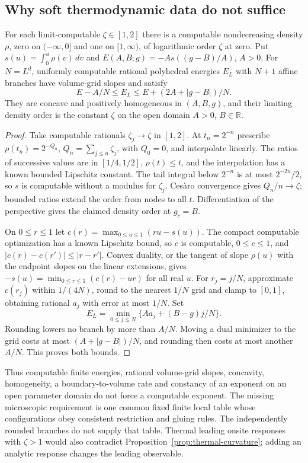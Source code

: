 \subsection{Why soft thermodynamic data do not suffice}
\begin{proposition}\label{prop:polyhedral-imitation}
For each limit-computable $\zeta\in[1,2]$ there is a computable
nondecreasing density $\rho$, zero on $(-\infty,0]$ and one on
$[1,\infty)$, of logarithmic order $\zeta$ at zero. Put
$s(u)=\int_0^u\rho(v)\,dv$ and
$E(A,B;g)=-A s((g-B)/A)$, $A>0$.
For $N=L^d$, uniformly computable rational polyhedral energies $E_L$
with $N+1$ affine branches have volume-grid slopes and satisfy
\[
 E-A/N\leq E_L\leq E+(2A+|g-B|)/N.
\]
They are concave and positively homogeneous in $(A,B,g)$, and their
limiting density order is the constant $\zeta$ on the open domain
$A>0$, $B\in\mathbb R$.
\end{proposition}
\begin{proof}
Take computable rationals $\zeta_j\to\zeta$ in $[1,2]$.
At $t_n=2^{-n}$ prescribe
$\rho(t_n)=2^{-Q_n}$, $Q_n=\sum_{j\leq n}\zeta_j$, with
$Q_0=0$, and interpolate linearly. The ratios of successive values
are in $[1/4,1/2]$, $\rho(t)\leq t$, and the interpolation has a
known bounded Lipschitz constant. The tail integral below $2^{-n}$
is at most $2^{-2n}/2$, so $s$ is computable without a modulus for
$\zeta_j$. Ces\`aro convergence gives $Q_n/n\to\zeta$; bounded
ratios extend the order from nodes to all $t$. Differentiation of
the perspective gives the claimed density order at $g_c=B$.

On $0\leq r\leq1$ let $c(r)=\max_{0\leq u\leq1}(ru-s(u))$.
The compact computable optimization has a known Lipschitz bound,
so $c$ is computable, $0\leq c\leq1$, and
$|c(r)-c(r')|\leq|r-r'|$. Convex duality, or the tangent of slope
$\rho(u)$ with the endpoint slopes on the linear extensions, gives
$-s(u)=\min_{0\leq r\leq1}(c(r)-ur)$ for all real $u$.
For $r_j=j/N$, approximate $c(r_j)$ within $1/(4N)$, round to the
nearest $1/N$ grid and clamp to $[0,1]$, obtaining rational $a_j$
with error at most $1/N$. Set
\[
 E_L=\min_{0\leq j\leq N}\{Aa_j+(B-g)j/N\}.
\]
Rounding lowers no branch by more than $A/N$. Moving a dual
minimizer to the grid costs at most $(A+|g-B|)/N$, and rounding
then costs at most another $A/N$. This proves both bounds.
\end{proof}
Thus computable finite energies, rational volume-grid slopes,
concavity, homogeneity, a boundary-to-volume rate and constancy of
an exponent on an open parameter domain do not force a computable
exponent. The missing microscopic requirement is one common fixed
finite local table whose configurations obey consistent restriction
and gluing rules. The independently rounded branches do not supply
that table. Thermal leading onsite responses with $\zeta>1$ would
also contradict Proposition~\ref{prop:thermal-curvature}; adding an
analytic response changes the leading observable.

